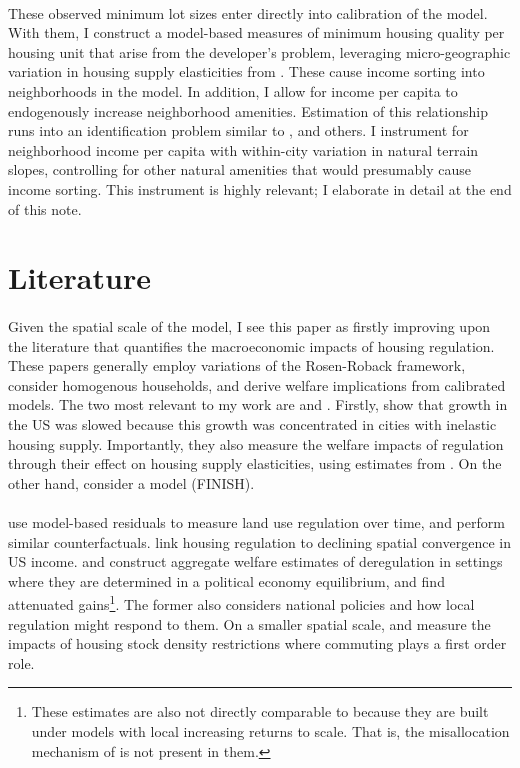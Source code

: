 \documentclass[]{article}
\begin{document}
\paragraph*{}
These observed minimum lot sizes enter directly into calibration of the model. With them, I construct a model-based measures of minimum housing quality per housing unit that arise from the developer's problem, leveraging micro-geographic variation in housing supply elasticities from \cite{BSH}. These cause income sorting into neighborhoods in the model. In addition, I allow for income per capita to endogenously increase neighborhood amenities. Estimation of this relationship runs into an identification problem similar to \cite{diamond2016}, and others. I instrument for neighborhood income per capita with within-city variation in natural terrain slopes, controlling for other natural amenities that would presumably cause income sorting. This instrument is highly relevant; I elaborate in detail at the end of this note.

\section{Literature}
\paragraph*{}
Given the spatial scale of the model, I see this paper as firstly improving upon the literature that quantifies the macroeconomic impacts of housing regulation. These papers generally employ variations of the Rosen-Roback framework, consider homogenous households, and derive welfare implications from calibrated models. The two most relevant to my work are \cite{hseihmoretti} and \cite{durantonpugaurbgrowth}. Firstly, \cite{hseihmoretti} show that growth in the US was slowed because this growth was concentrated in cities with inelastic housing supply. Importantly, they also measure the welfare impacts of regulation through their effect on housing supply elasticities, using estimates from \cite{saiz2010}. On the other hand, \cite{durantonpugaurbgrowth} consider a model (FINISH). 
\paragraph*{}
 \cite*{hop} use model-based residuals to measure land use regulation over time, and perform similar counterfactuals. \cite{ganongshoag} link housing regulation to declining spatial convergence in US income. \cite{parkho} and \cite{bunten} construct aggregate welfare estimates of deregulation in settings where they are determined in a political economy equilibrium, and find attenuated gains\footnote{These estimates are also not directly comparable to \cite{hseihmoretti} because they are built under models with local increasing returns to scale. That is, the misallocation mechanism of \cite{hseihmoretti} is not present in them.}.  The former also considers national policies and how local regulation might respond to them. On a smaller spatial scale, \cite{martynov} and \cite{acosta} measure the impacts of housing stock density restrictions where commuting plays a first order role. 
\end{document}
